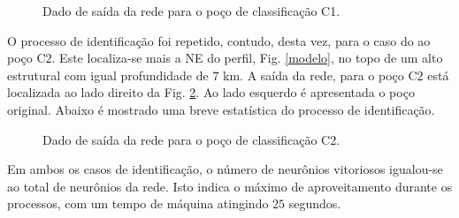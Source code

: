 \begin{figure}[H]
	\centering
	\setlength{\fboxsep}{8pt}
	\setlength{\fboxrule}{0.1pt}
	\caption{Dado de saída da rede para o poço de classificação C1.}
	\label{Class C1}
\end{figure} 


O processo de identificação foi repetido, contudo, desta vez, para o caso do ao poço C$2$. Este localiza-se mais a NE do perfil, Fig. \ref{modelo}, no topo de um alto estrutural com igual profundidade de $7$ km. A saída da rede, para o poço C$2$ está localizada ao lado direito da Fig. \ref{Class C2}. Ao lado esquerdo é apresentada o poço original. Abaixo é mostrado uma breve estatística do processo de identificação.   


\begin{figure}[H]
	\centering
	\setlength{\fboxsep}{8pt}
	\setlength{\fboxrule}{0.1pt}
	\caption{Dado de saída da rede para o poço de classificação C2.}
	\label{Class C2}
\end{figure} 


Em ambos os casos de identificação, o número de neurônios vitoriosos igualou-se ao total de neurônios da rede. Isto indica o máximo de aproveitamento durante os processos, com um tempo de máquina atingindo $25$ segundos.  

